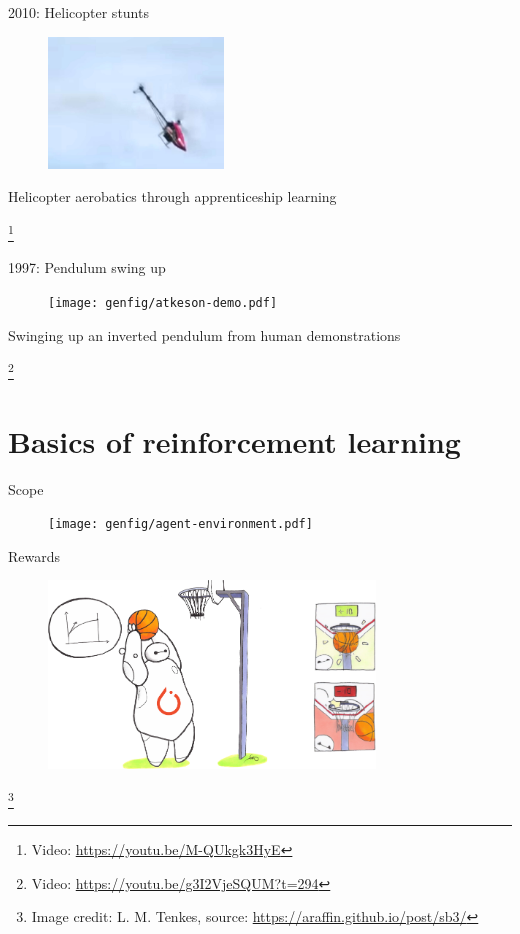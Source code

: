 \documentclass[10pt, aspectratio=1610]{beamer}
\newcommand\blfootnote[1]{%
  \begingroup
  \renewcommand\thefootnote{}%
  \footnote{#1}%
  \addtocounter{footnote}{-1}%
  \endgroup
}
\begin{document}
\begin{frame}{2010: Helicopter stunts}
    \vspace{1.5em}
    \begin{figure}
        \includegraphics[height=3.5cm]{figures/helicopter-stunts.jpg}
    \end{figure}
    \begin{center}
        Helicopter aerobatics through apprenticeship learning~\cite{abbeel2010}
    \end{center}
    \blfootnote{Video: \url{https://youtu.be/M-QUkgk3HyE}}
\end{frame}

\begin{frame}{1997: Pendulum swing up}
    \vspace{1.5em}
    \begin{figure}
        \texttt{[image: genfig/atkeson-demo.pdf]}
    \end{figure}
    \begin{center}
        Swinging up an inverted pendulum from human demonstrations~\cite{atkeson1997}
    \end{center}
    \blfootnote{ Video: \url{https://youtu.be/g3I2VjeSQUM?t=294} }
\end{frame}


\section*{Basics of reinforcement learning}

\begin{frame}{Scope}
    \begin{figure}
        \texttt{[image: genfig/agent-environment.pdf]}
    \end{figure}
\end{frame}

\begin{frame}{Rewards}
    \begin{figure}
        \includegraphics[height=5cm]{figures/stable-baselines3-logo.png}
    \end{figure}
    \blfootnote{
        Image credit: L. M. Tenkes, source: \url{https://araffin.github.io/post/sb3/}
    }
\end{frame}
\end{document}

